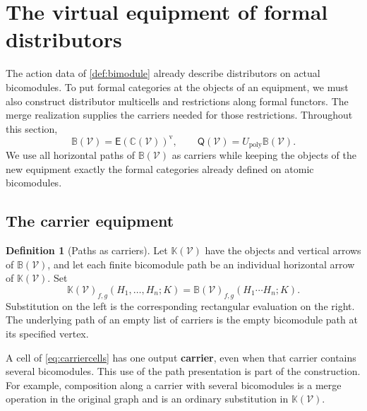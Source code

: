 \documentclass[11pt,reqno]{amsart}
\theoremstyle{plain}
\theoremstyle{definition}
\newtheorem{definition}[theorem]{Definition}
\theoremstyle{remark}
\numberwithin{equation}{section}
\newcommand{\V}{\mathcal V}
\newcommand{\E}{\mathsf E}
\newcommand{\Q}{\mathsf Q}
\newcommand{\Ccal}{\mathbb C}
\newcommand{\Kcal}{\mathbb K}
\newcommand{\Up}{U_{\mathrm{poly}}}
\newcommand{\vop}{\mathrm v}
\begin{document}
\section{The virtual equipment of formal distributors}\label{sec:distributors}

The action data of \cref{def:bimodule} already describe distributors on
actual bicomodules. To put formal categories at the objects of an
equipment, we must also construct distributor multicells and restrictions
along formal functors. The merge realization supplies the carriers needed
for those restrictions. Throughout this section,
\[
 \mathbb B(\V)=\E(\Ccal(\V))^{\vop},\qquad
 \Q(\V)=\Up\mathbb B(\V).
\]
We use all horizontal paths of $\mathbb B(\V)$ as carriers while keeping
the objects of the new equipment exactly the formal categories already
defined on atomic bicomodules.

\subsection{The carrier equipment}

\begin{definition}[Paths as carriers]\label{def:carrierequipment}
Let $\Kcal(\V)$ have the objects and vertical arrows of $\mathbb B(\V)$,
and let each finite bicomodule path be an individual horizontal arrow of
$\Kcal(\V)$. Set
\begin{equation}\label{eq:carriercells}
 \Kcal(\V)_{f,g}(H_1,\ldots,H_n;K)
 =\mathbb B(\V)_{f,g}(H_1\cdots H_n;K).
\end{equation}
Substitution on the left is the corresponding rectangular evaluation on
the right. The underlying path of an empty list of carriers is the empty
bicomodule path at its specified vertex.
\end{definition}

A cell of \cref{eq:carriercells} has one output \textbf{carrier}, even
when that carrier contains several bicomodules. This use of the path
presentation is part of the construction. For example, composition along
a carrier with several bicomodules is a merge operation in the original
graph and is an ordinary substitution in $\Kcal(\V)$.
\end{document}
